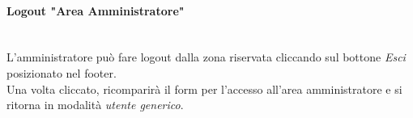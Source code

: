\paragraph{Logout "Area Amministratore"}\mbox{}\\
\label{par:LogoutAA}
L'amministratore può fare logout dalla zona riservata cliccando sul bottone \emph{Esci} posizionato nel footer.\\ Una volta cliccato, ricomparirà il form per l'accesso all'area amministratore e si ritorna in modalità \emph{utente generico}.\\